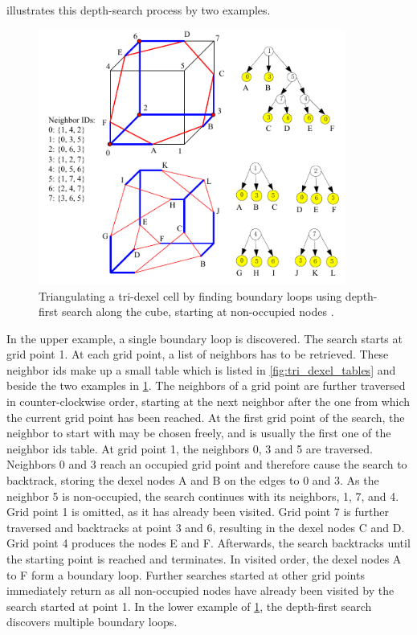  illustrates this depth-search process by two examples.
%
\begin{figure}
	\centering
	\includegraphics[width=0.9\textwidth]{images/tri_dexel_triangulation}
	\caption{
		Triangulating a tri-dexel cell by finding boundary loops using depth-first search along the cube, starting at non-occupied nodes \cite{tridexel_reconstruction}.
	}
	\label{fig:tri_dexel_triangulation}
\end{figure}
%
In the upper example, a single boundary loop is discovered.
The search starts at grid point 1.
At each grid point, a list of neighbors has to be retrieved.
These neighbor ids make up a small table which is listed in \cref{fig:tri_dexel_tables} and beside the two examples in \cref{fig:tri_dexel_triangulation}.
The neighbors of a grid point are further traversed in counter-clockwise order, starting at the next neighbor after the one from which the current grid point has been reached.
At the first grid point of the search, the neighbor to start with may be chosen freely, and is usually the first one of the neighbor ids table.
At grid point 1, the neighbors 0, 3 and 5 are traversed.
Neighbors 0 and 3 reach an occupied grid point and therefore cause the search to backtrack, storing the dexel nodes A and B on the edges to 0 and 3.
As the neighbor 5 is non-occupied, the search continues with its neighbors, 1, 7, and 4.
Grid point 1 is omitted, as it has already been visited.
Grid point 7 is further traversed and backtracks at point 3 and 6, resulting in the dexel nodes C and D.
Grid point 4 produces the nodes E and F.
Afterwards, the search backtracks until the starting point is reached and terminates.
In visited order, the dexel nodes A to F form a boundary loop.
Further searches started at other grid points immediately return as all non-occupied nodes have already been visited by the search started at point 1.
%
In the lower example of \cref{fig:tri_dexel_triangulation}, the depth-first search discovers multiple boundary loops.

